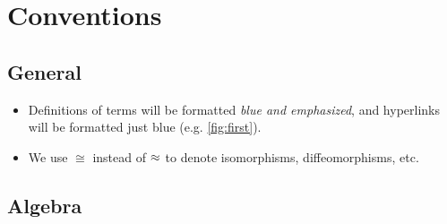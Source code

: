 %

\section*{Conventions}

\subsection*{General}

\begin{itemize}
  \item Definitions of terms will be formatted {\color{blue}\emph{blue and emphasized}}, and hyperlinks will be formatted just blue (e.g. \cref{fig:first}).
  \item We use $\cong$ instead of $\oldcong$ to denote isomorphisms, diffeomorphisms, etc.
\end{itemize}

\subsection*{Algebra}

